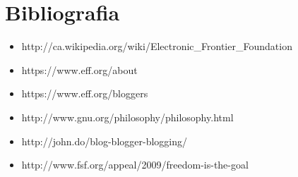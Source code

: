 \section{Bibliografia}

\begin{itemize}
\item{http://ca.wikipedia.org/wiki/Electronic\_Frontier\_Foundation}
\item{https://www.eff.org/about}
\item{https://www.eff.org/bloggers}
\item{http://www.gnu.org/philosophy/philosophy.html}
\item{http://john.do/blog-blogger-blogging/}
\item{http://www.fsf.org/appeal/2009/freedom-is-the-goal}


\end{itemize}






